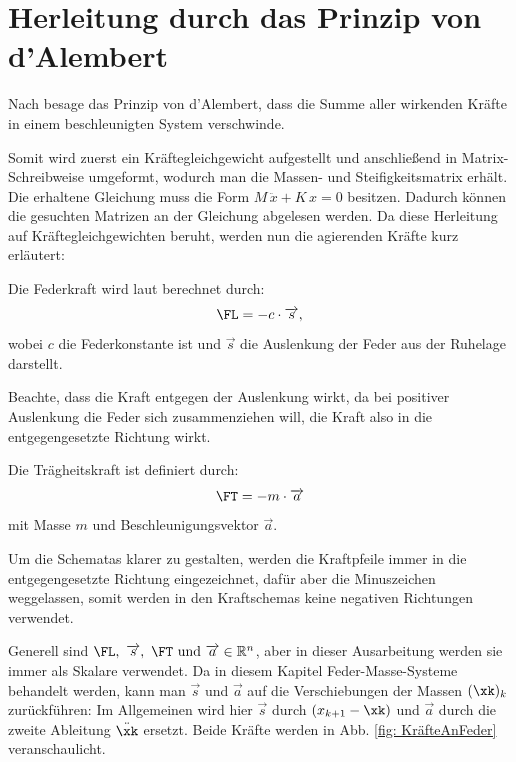 \documentclass[ngerman,BCOR=4mm]{tudscrreprt}
\newcommand{\R}{\mathbb R}
\theoremstyle{plain} %
\theoremstyle{definition} %
\theoremstyle{remark}
\begin{document}
      \section{Herleitung durch das Prinzip von d'Alembert}
            Nach \cite{d_AlembertPrinzip} besage das Prinzip von d'Alembert, dass die Summe aller wirkenden Kräfte in einem beschleunigten System verschwinde.

            Somit wird zuerst ein Kräftegleichgewicht aufgestellt und anschließend in Matrix-Schreibweise umgeformt, wodurch man die Massen- und Steifigkeitsmatrix erhält.
            Die erhaltene Gleichung muss die Form $M\,\ddot x+K\,x = 0$ besitzen. Dadurch können die gesuchten Matrizen an der Gleichung abgelesen werden.
            Da diese Herleitung auf Kräftegleichgewichten beruht, werden nun die agierenden Kräfte kurz erläutert:

            Die Federkraft \FL wird laut \cite{federkraft} berechnet durch:
            \begin{equation}
                  \label{eqn: Federkraft}
                  \FL = -c\cdot \overrightarrow s,
            \end{equation}
            wobei $c$ die Federkonstante ist und $\overrightarrow s$ die Auslenkung der Feder aus der Ruhelage darstellt.

            Beachte, dass die Kraft entgegen der Auslenkung wirkt, da bei positiver Auslenkung die Feder sich zusammenziehen will, die Kraft also in die entgegengesetzte Richtung wirkt.
                  
            Die Trägheitskraft \FT ist definiert durch:
            \begin{equation}
                  \label{eqn: Trägheitskraft}
                  \FT = -m\cdot \overrightarrow{a}
            \end{equation}
            mit Masse $m$ und Beschleunigungsvektor $\overrightarrow{a}$.                  

            Um die Schematas klarer zu gestalten, werden die Kraftpfeile immer in die entgegengesetzte Richtung eingezeichnet, dafür aber die Minuszeichen weggelassen,
            somit werden in den Kraftschemas keine negativen Richtungen verwendet.

            Generell sind $\FL,\ \overrightarrow{s},\ \FT \text{ und } \overrightarrow{a}\in \R^n$, aber in dieser Ausarbeitung werden sie immer als Skalare verwendet. 
            Da in diesem Kapitel Feder-Masse-Systeme behandelt werden, kann man $\overrightarrow{s}$ und $\overrightarrow{a}$ auf die Verschiebungen der Massen $(\xk)_k$ zurückführen:
            Im Allgemeinen wird hier $\overrightarrow{s}$ durch $(x_{k+1}-\xk)$ und $\overrightarrow{a}$ durch die zweite Ableitung $\ddot \xk$ ersetzt.
            Beide Kräfte werden in Abb. \ref{fig: KräfteAnFeder} veranschaulicht.
\end{document}
